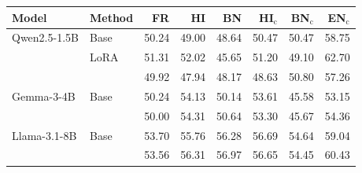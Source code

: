   \footnotesize\setlength{\tabcolsep}{4pt}
  \begin{tabular}{@{}llrrrrrr@{}}
    \toprule
    Model & Method & FR & HI & BN & HI$_{\mathrm{c}}$ & BN$_{\mathrm{c}}$ & EN$_{\mathrm{c}}$ \\
    \midrule
    Qwen2.5-1.5B & Base & 50.24 & 49.00 & 48.64 & 50.47 & 50.47 & 58.75 \\
     & LoRA & 51.31 & 52.02 & 45.65 & 51.20 & 49.10 & 62.70 \\
     & \PEAT{} & 49.92 & 47.94 & 48.17 & 48.63 & 50.80 & 57.26 \\
    \midrule
    Gemma-3-4B & Base & 50.24 & 54.13 & 50.14 & 53.61 & 45.58 & 53.15 \\
     & \PEAT{} & 50.00 & 54.31 & 50.64 & 53.30 & 45.67 & 54.36 \\
    \midrule
    Llama-3.1-8B & Base & 53.70 & 55.76 & 56.28 & 56.69 & 54.64 & 59.04 \\
     & \PEAT{} & 53.56 & 56.31 & 56.97 & 56.65 & 54.45 & 60.43 \\
    \bottomrule
  \end{tabular}
